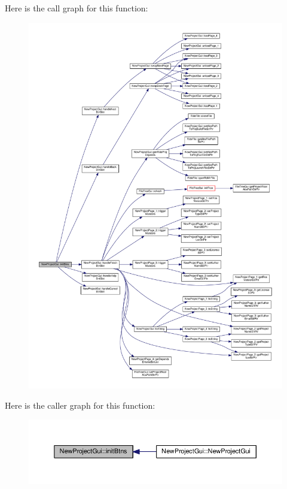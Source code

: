 Here is the call graph for this function\-:
\nopagebreak
\begin{figure}[H]
\begin{center}
\leavevmode
\includegraphics[width=350pt]{class_new_project_gui_a5822d7472aff8da63b822e09afa481e1_cgraph}
\end{center}
\end{figure}




Here is the caller graph for this function\-:
\nopagebreak
\begin{figure}[H]
\begin{center}
\leavevmode
\includegraphics[width=350pt]{class_new_project_gui_a5822d7472aff8da63b822e09afa481e1_icgraph}
\end{center}
\end{figure}


